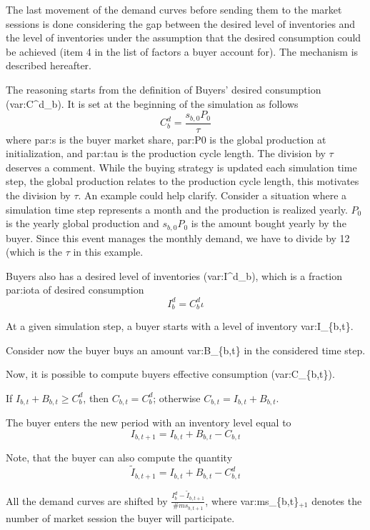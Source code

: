 \documentclass{article}
\begin{document}
\vskip5mm
The last movement of the demand curves before sending them to the market sessions is done considering the gap between the desired level of inventories and the level of inventories under the assumption that the desired consumption could be achieved (item 4 in the list of factors a buyer account for). The mechanism is described hereafter.

The reasoning starts from the definition of Buyers' desired consumption (\gls{var:C^d_b}). It  is set at the beginning of the simulation as follows 
\[C^d_b=\frac{s_{b,0}P_0}{\tau}\]
where \gls{par:s} is the buyer market share, \gls{par:P0} is the global production at initialization, and \gls{par:tau} is the production cycle length. 
The division by $\tau$ deserves a comment. While the buying strategy is updated each simulation time step, the global production relates to the production cycle length, this motivates the division by $\tau$. An example could help clarify. Consider a situation where a simulation time step represents a month and the production is realized yearly. $P_0$ is the yearly global production and $s_{b,0}P_0$ is the amount bought yearly by the buyer. Since this event manages the monthly demand, we have to divide by 12 (which is the $\tau$ in this example.   

Buyers also has a desired level of inventories (\gls{var:I^d_b}), which is a fraction \gls{par:iota} of desired consumption
\[I^d_b=C^d_b\iota\]

At a given simulation step, a buyer starts with a level of inventory \gls{var:I_{b,t}}.


Consider now %
the buyer buys an amount \gls{var:B_{b,t}} in the considered time step.

Now, it is possible to compute buyers effective consumption (\gls{var:C_{b,t}}).

If $I_{b,t}+B_{b,t}\ge C^d_b$, then $C_{b,t}=C^d_b$; otherwise  $C_{b,t}=I_{b,t}+B_{b,t}$.

The buyer enters the new period with an inventory level equal to
\[
I_{b,t+1}=I_{b,t}+B_{b,t}-C_{b,t}
\]

Note, that the buyer can also compute the quantity 
\[
	\tilde{I}_{b,t+1}=I_{b,t}+B_{b,t}-C^d_{b,t}
\]

All the demand curves are shifted by $\frac{I^d_{b}-\tilde{I}_{b,t+1}}{\#ms_{b,t+1}}$, where \gls{var:ms_{b,t}}$_{+1}$ denotes the number of market session the buyer will participate.
\end{document}

